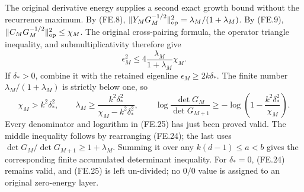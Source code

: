 The original derivative energy supplies a second exact growth bound
without the recurrence maximum.  By (FE.8),
\(\|Y_MG_M^{-1/2}\|_{\rm op}^2
=\lambda_M/(1+\lambda_M)\).  By (FE.9),
\(\|C_MG_M^{-1/2}\|_{\rm op}^2\le\chi_M\).
The original cross-pairing formula, the operator triangle inequality,
and submultiplicativity therefore give
\[
 \epsilon_M^2\le4\frac{\lambda_M}{1+\lambda_M}\chi_M.
 \tag{FE.24}
\]
If \(\delta_*>0\), combine it with the retained eigenline
\(\epsilon_M\ge2k\delta_*\).  The finite number
\(\lambda_M/(1+\lambda_M)\) is strictly below one, so
\[
 \chi_M>k^2\delta_*^2,\qquad
 \lambda_M\ge
       \frac{k^2\delta_*^2}{\chi_M-k^2\delta_*^2},\qquad
 \log\frac{\det G_M}{\det G_{M+1}}
       \ge-\log\left(1-\frac{k^2\delta_*^2}{\chi_M}\right).
 \tag{FE.25}
\]
Every denominator and logarithm in (FE.25) has just been proved
valid.  The middle inequality follows by rearranging (FE.24);
the last uses \(\det G_M/\det G_{M+1}\ge1+\lambda_M\).
Summing it over any \(k(d-1)\le a<b\) gives the corresponding
finite accumulated determinant inequality.  For \(\delta_*=0\),
(FE.24) remains valid, and (FE.25) is left un-divided; no
\(0/0\) value is assigned to an original zero-energy layer.
